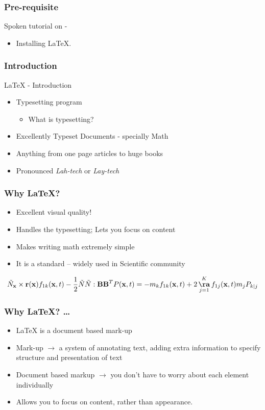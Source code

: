 \documentclass[12pt,compress]{beamer}
\begin{document}
\begin{frame}
\frametitle{Pre-requisite}
\label{sec-3}

  Spoken tutorial on -

\begin{itemize}
\item Installing {\LaTeX}.
\end{itemize}
\end{frame}

\begin{frame}[fragile]
  \frametitle{Introduction}
  \begin{block}{{\LaTeX} - Introduction}
    \begin{itemize}
      \item Typesetting program
       \begin{itemize}
         \item What is typesetting?
       \end{itemize}
      \item Excellently Typeset Documents - specially Math
      \item Anything from one page articles to huge books
      \item Pronounced \emph{Lah-tech} or \emph{Lay-tech}
    \end{itemize}
  \end{block}
\end{frame}

\begin{frame}[fragile]
  \frametitle{Why {\LaTeX}?}
  \begin{itemize}
  \item Excellent visual quality! 
  \item Handles the typesetting; Lets you focus on content
  \item Makes writing math extremely simple
  \item It is a standard -- widely used in Scientific community
  \end{itemize}
  \begin{block}{}
    \[\tilde{N}_{\mathbf{x}}\times \mathbf{r}(\mathbf{x}) f_{1k}(\mathbf{x},t) - \frac{1}{2} \tilde{N} \tilde{N}:\mathbf{BB}^{T}P(\mathbf{x},t) = -m_{k}f_{1k}(\mathbf{x},t) + 2 \mathop{\mathbf{\aa}}_{j=1}^{K} f_{1j}(\mathbf{x},t)m_{j}P_{k|j} \]
  \end{block}
\end{frame}

\begin{frame}[fragile]
  \frametitle{Why \LaTeX? \ldots}
  \begin{itemize}
  \item {\LaTeX} is a document based mark-up
  \item Mark-up $\rightarrow$ a system of annotating text, adding extra
    information to specify structure and presentation of text
  \item Document based markup $\rightarrow$ you don't have to worry
    about each element individually 
  \item Allows you to focus on content, rather than appearance.
  \end{itemize}
\end{frame}
\end{document}
